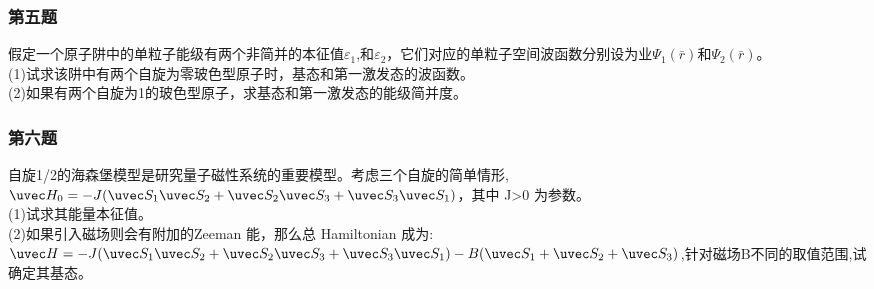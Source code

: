 \subsubsection{第五题}
假定一个原子阱中的单粒子能级有两个非简并的本征值$\varepsilon_1$,和$\varepsilon_2$，它们对应的单粒子空间波函数分别设为业$\Psi_1(\bar r)$和$\Psi_2(\bar r)$。\\
(1)试求该阱中有两个自旋为零玻色型原子时，基态和第一激发态的波函数。\\
(2)如果有两个自旋为1的玻色型原子，求基态和第一激发态的能级简并度。
\subsubsection{第六题}
自旋1/2的海森堡模型是研究量子磁性系统的重要模型。考虑三个自旋的简单情形,
$\uvec H_0=-J(\uvec S_1 \uvec S_2+\uvec S_2 \uvec S_3+\uvec S_3\uvec S_1)$，其中 J>0 为参数。\\
(1)试求其能量本征值。\\
(2)如果引入磁场则会有附加的Zeeman 能，那么总 Hamiltonian 成为:$\uvec H=-J(\uvec S_1 \uvec S_2+\uvec S_2 \uvec S_3+\uvec S_3\uvec S_1)-B(\uvec S_1+\uvec S_2+\uvec S_3)$,针对磁场B不同的取值范围,试确定其基态。
